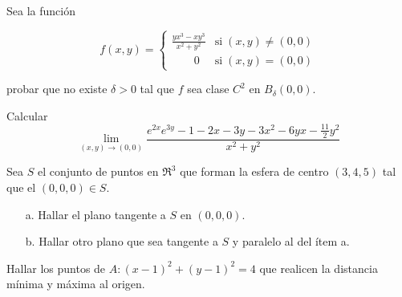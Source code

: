 
\begin{question}
    Sea la función
    
    \[
    f(x,y) = 
    \begin{cases}
        \displaystyle \frac{yx^3-xy^3}{x^2+y^2} & \text{si}\; (x,y) \neq (0,0) \\[10pt]
        \qquad 0 & \text{si}\; (x,y)=(0,0)
    \end{cases}
    \]
    
    probar que no existe $\delta>0$ tal que $f$ sea clase $C^2$ en $B_{\delta}(0,0)$.
\end{question}


\begin{question} Calcular
\[
\lim_{(x,y) \to (0,0)}
\frac{e^{2x}e^{3y} - 1 - 2x -3y - 3x^2 - 6yx - \frac{11}{2}y^2}{x^2+y^2}
\]
\end{question}


\begin{question}
    Sea $S$ el conjunto de puntos en  $\Re^{3}$  que forman la esfera de centro $(3,4,5)$ tal que el $(0,0,0) \in S$.
    \begin{itemize}
        \item [a.] Hallar el plano tangente a $S$ en $(0,0,0)$.
        \item [b.] Hallar otro plano que sea tangente a $S$ y paralelo al del ítem a.
    \end{itemize}
\end{question}


\begin{question}
    Hallar los puntos de $A:(x-1)^2 + (y-1)^2 = 4$ que realicen la distancia mínima y máxima al origen.
\end{question}

\newpage

